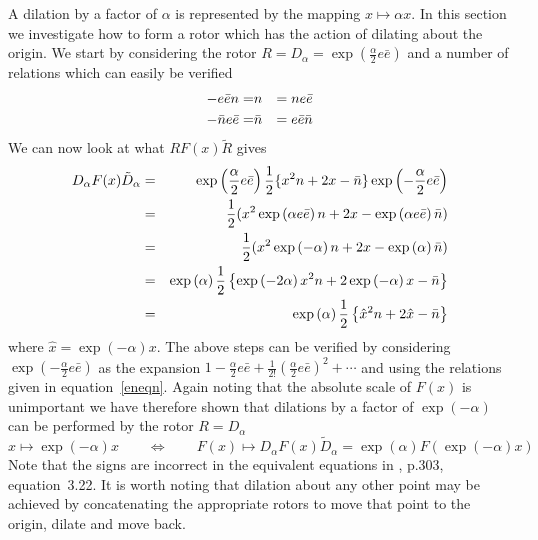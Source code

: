 A dilation by a factor of $\alpha$ is represented by the mapping
$x \mapsto \alpha x$. In this section we investigate how
to form a rotor which has the action of dilating about the
origin. We start by considering the rotor $R = D_{\alpha} =
\exp\left({\frac{\alpha}{2}e\bar{e}}\right)$ and a number of
relations which can easily be verified
%
\begin{eqnarray}
   -e\bar{e}n  = &  {n} & = ne\bar{e}  \nonumber \\
   -\bar{n}e\bar{e} = &  \bar{n} & =  e\bar{e}\bar{n}  \label{eneqn}
\end{eqnarray}
%
We can now look at what $RF(x)\tilde{R}$ gives
%
\begin{eqnarray}
D_\alpha F(x) \tilde{D}_\alpha & = & \exp\left({\frac{\alpha}{2}e\bar{e}}\right)\frac{1}{2}\{ x^2n + 2x - \bar{n}\}\exp\left({-\frac{\alpha}{2}e\bar{e}}\right) \nonumber \\
   &  =  &  \frac{1}{2}(x^2  \exp\left({\alpha e\bar{e}}\right)n + 2x - \exp\left({\alpha e\bar{e}}\right)\bar{n}) \nonumber \\
   & = &  \frac{1}{2}(x^2 \exp\left({-\alpha}\right) n + 2x - \exp\left({\alpha}\right)\bar{n}) \nonumber \\
   & = & \exp\left({\alpha}\right)\frac{1}{2}\left\{\exp\left({-2\alpha}\right)x^2n + 2\exp\left({-\alpha}\right)x - \bar{n}\right\} \nonumber \\
   & = & \exp\left({\alpha}\right)\frac{1}{2}\left\{\hat{x}^2n + 2\hat{x} -\bar{n}\right\}
\label{Deqn}
\end{eqnarray}
%
where $\hat{x} = \exp\left({-\alpha}\right)x$. The above steps can be
verified by considering $\exp\left({-\frac{\alpha}{2}e\bar{e}}\right)$ as
the expansion $1 - \frac{\alpha}{2}e\bar{e} +
\frac{1}{2!}\left(\frac{\alpha}{2}e\bar{e}\right)^2 +
\cdots$ and using the relations given in
equation~\ref{eneqn}.
Again noting that the absolute scale of $F(x)$ is unimportant we
have therefore shown that dilations by a factor of $\exp\left({-\alpha}\right)$ 
can be performed by the rotor $R=D_\alpha$
 \begin{equation}
x \mapsto \exp({-\alpha})x \qquad \Leftrightarrow \qquad F(x)
\mapsto  D_{\alpha} F(x) \tilde{D}_{\alpha} =
\exp({\alpha})F(\exp({-\alpha})x)
\end{equation}
%
Note that the signs are incorrect in the equivalent
equations in \cite{HS84}, p.303, equation~3.22. It is worth noting
that dilation about any other point may be achieved by concatenating the
appropriate rotors to move that point to the origin, dilate and move back.


